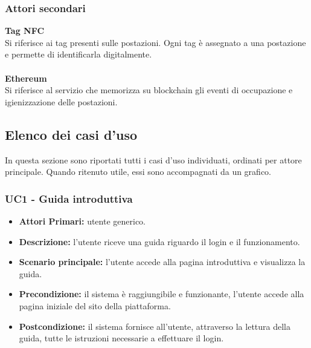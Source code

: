 \subsubsection{Attori secondari}
\textbf{Tag NFC}\\
Si riferisce ai tag presenti sulle postazioni. Ogni tag è assegnato a una postazione e permette di identificarla digitalmente.\\
\\
\textbf{Ethereum}\\
Si riferisce al servizio che memorizza su blockchain gli eventi di occupazione e igienizzazione delle postazioni.\\

\subsection{Elenco dei casi d'uso}
In questa sezione sono riportati tutti i casi d'uso individuati, ordinati per attore principale. Quando ritenuto utile, essi sono accompagnati da un grafico.
\\
\subsubsection{ UC1 - Guida introduttiva}
\begin{itemize}
           	\item\textbf{Attori Primari:} utente generico.
           	\item\textbf{Descrizione:} l'utente riceve una guida riguardo il login e il funzionamento.
           	\item\textbf{Scenario principale:} l’utente accede alla pagina introduttiva e visualizza la guida.
           	\item\textbf{Precondizione:} il sistema è raggiungibile e funzionante, l’utente accede alla pagina iniziale del sito della piattaforma.
           	\item\textbf{Postcondizione:} il sistema fornisce all’utente, attraverso la lettura della guida, tutte le istruzioni necessarie a effettuare il login.
\end{itemize}

